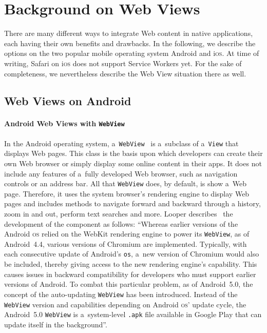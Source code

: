 \documentclass[sigconf]{acmart}
\begin{document}
\section{Background on Web Views}
\label{sec:background}

There are many different ways to integrate Web content in native applications,
each having their own benefits and drawbacks.
In the following, we describe the options on the two popular
mobile operating system Android and i\textsc{os}.
At time of writing, Safari on i\textsc{os} does not support Service Workers yet.
For the sake of completeness, we nevertheless describe the Web View situation there as well.

\subsection{Web Views on Android}

\paragraph{Android Web Views with \texttt{WebView}}

In the Android operating system, a~\texttt{WebView}~\cite{android2018webview}
is a~subclass of a~\texttt{View} that displays Web pages.
This class is the basis upon which developers can create their own Web browser
or simply display some online content in their apps.
It does not include any features of a~fully developed Web browser,
such as navigation controls or an address bar.
All that \texttt{WebView} does, by default, is show a~Web page.
Therefore, it uses the system browser's rendering engine to display Web pages
and includes methods to navigate forward and backward through a history,
zoom in and out, perform text searches and more.
Looper describes~\cite{looper2015webviews}
the development of the component as follows:
``Whereas earlier versions of the Android \textsc{os}
relied on the WebKit rendering engine to power its \texttt{WebView},
as of Android~4.4, various versions of Chromium are implemented.
Typically, with each consecutive update of Android's \texttt{os},
a~new version of Chromium would also be included, thereby giving access
to the new rendering engine's capability.
This causes issues in backward compatibility for developers
who must support earlier versions of Android.
To combat this particular problem, as of Android~5.0,
the concept of the auto-updating \texttt{WebView} has been introduced.
Instead of the \texttt{WebView} version and capabilities
depending on Android \textsc{os}' update cycle,
the Android~5.0 \texttt{WebView} is a~system-level \texttt{.apk} file
available in Google Play that can update itself in the background''.
\end{document}
